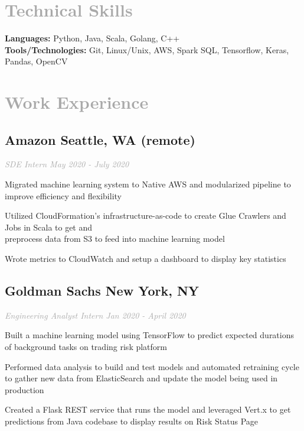 \documentclass{article}
\begin{document}
{\section[Technical Skills \hfill]{\textcolor{darkgray}{Technical Skills \sout{\hfill}}}
	{\bfseries Languages: }Python, Java, Scala, Golang, C++\\
    {\bfseries Tools/Technologies: }Git, Linux/Unix, AWS, Spark SQL, Tensorflow, Keras, Pandas, OpenCV
  
\section[Work Experience \hfill]{\textcolor{darkgray}{Work Experience \sout{\hfill}}}
	\subsection{{\bfseries\large Amazon} \hfill Seattle, WA (remote)}
	\textit{\textcolor{darkgray}{SDE Intern \hfill \textit{May 2020 - July 2020}}}
	\begin{myitemize}
		\item Migrated machine learning system to Native AWS and modularized pipeline to improve efficiency and flexibility
		\item Utilized CloudFormation's infrastructure-as-code to create Glue Crawlers and Jobs in Scala to get and \\
		preprocess data from S3 to feed into machine learning model
		\item Wrote metrics to CloudWatch and setup a dashboard to display key statistics
	\end{myitemize}

	\subsection{{\bfseries\large Goldman Sachs} \hfill New York, NY}
	\textit{\textcolor{darkgray}{Engineering Analyst Intern \hfill \textit{Jan 2020 - April 2020}}}
	\begin{myitemize}
		\item Built a machine learning model using TensorFlow to predict expected durations of background tasks on trading risk platform
		\item Performed data analysis to build and test models and automated retraining cycle to gather new data from ElasticSearch and update the model being used in production
		\item Created a Flask REST service that runs the model and leveraged Vert.x to get predictions from Java codebase to display results on Risk Status Page
	\end{myitemize}

}
\end{document}
